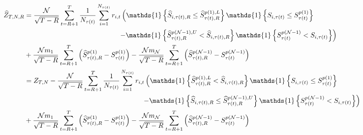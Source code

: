 \begin{align*}
    \widehat{Z}_{T,N,R} &=\frac{\mathcal{N}}{\sqrt{T-R}}\sum_{t=R+1}^{T}\frac{1}{N_{\tau(t)}}\sum_{i=1}^{N_{\tau(t)}}r_{i,t}\left( \mathds{1} \left\{ \widehat{S}_{i,\tau(t),R}\leq \widehat{S}_{\tau(t),R}^{p(1),L}\right\} \mathds{1} \left\{ S_{i,\tau(t)}\leq S_{\tau(t)}^{p(1)}\right\} \right. \\
    & \hspace{4.8cm} \left. -\mathds{1} \left\{ \widehat{S}_{\tau(t),R}^{p(\mathcal{N}-1),U} < \widehat{S}_{i,\tau(t),R}\right\} \mathds{1} \left\{ S_{\tau(t)}^{p(\mathcal{N}-1)} < S_{i,\tau(t)}\right\} \right) \\
    &+\frac{\mathcal{N}m_{1}}{\sqrt{T-R}}\sum_{t=R+1}^{T}\left( \widehat{S}_{\tau(t),R}^{p(1)}-S_{\tau(t)}^{p(1)}\right) -\frac{\mathcal{N}m_{\mathcal{N}}}{\sqrt{T-R}}\sum_{t=R+1}^{T}\left( \widehat{S}_{\tau(t),R}^{p(\mathcal{N}-1)}-S_{\tau(t)}^{p(\mathcal{N}-1)}\right) \\
    &=Z_{T,N} - \frac{\mathcal{N}}{\sqrt{T-R}}\sum_{t=R+1}^{T}\frac{1}{N_{\tau(t)}}\sum_{i=1}^{N_{\tau(t)}}r_{i,t}\left( \mathds{1} \left\{  \widehat{S}_{\tau(t),R}^{p(1),L} < \widehat{S}_{i,\tau(t),R} \right\} \mathds{1} \left\{ S_{i,\tau(t)}\leq S_{\tau(t)}^{p(1)}\right\} \right. \\
    & \hspace{6.0cm} \left. -\mathds{1} \left\{ \widehat{S}_{i,\tau(t),R} \leq \widehat{S}_{\tau(t),R}^{p(\mathcal{N}-1),U} \right\} \mathds{1} \left\{ S_{\tau(t)}^{p(\mathcal{N}-1)} < S_{i,\tau(t)} \right\} \right) \\
    &+\frac{\mathcal{N}m_{1}}{\sqrt{T-R}}\sum_{t=R+1}^{T}\left( \widehat{S}_{\tau(t),R}^{p(1)}-S_{\tau(t)}^{p(1)}\right) -\frac{\mathcal{N}m_{\mathcal{N}}}{\sqrt{T-R}}\sum_{t=R+1}^{T}\left( \widehat{S}_{\tau(t),R}^{p(\mathcal{N}-1)}-S_{\tau(t)}^{p(\mathcal{N}-1)}\right)  
\end{align*}
